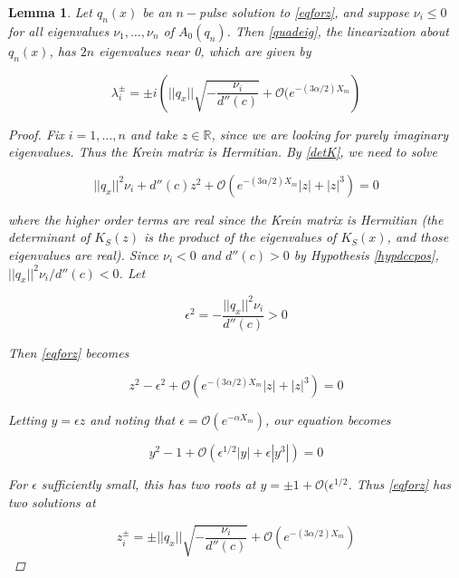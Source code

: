 \documentclass[12pt]{article}
\def\R{{\mathbb R}}
\newtheorem{lemma}{Lemma}
\begin{document}
\begin{lemma}
Let $q_n(x)$ be an $n-$pulse solution to \eqref{eqforz}, and suppose $\nu_i \leq 0$ for all eigenvalues $\nu_1, \dots, \nu_n$ of $A_0(q_n)$. Then \eqref{quadeig}, the linearization about $q_n(x)$, has $2n$ eigenvalues near 0, which are given by

\begin{equation}
\lambda_i^\pm = \pm i \left( ||q_x|| \sqrt{ -\frac{ \nu_i}{d''(c)} } + \mathcal{O}(e^{-(3 \alpha/2) X_m} \right)
\end{equation}

\begin{proof}
Fix $i = 1, \dots, n$ and take $z \in \R$, since we are looking for purely imaginary eigenvalues. Thus the Krein matrix is Hermitian. By \eqref{detK}, we need to solve

\begin{equation}\label{eqforz}
||q_x||^2 \nu_i + d''(c) z^2 + \mathcal{O}(e^{-(3 \alpha/2) X_m}|z| + |z|^3) = 0
\end{equation}

where the higher order terms are real since the Krein matrix is Hermitian (the determinant of $K_S(z)$ is the product of the eigenvalues of $K_S(x)$, and those eigenvalues are real). Since $\nu_i < 0$ and $d''(c) > 0$ by Hypothesis \ref{hypdccpos}, $||q_x||^2 \nu_i / d''(c) < 0$. Let

\begin{equation}
\epsilon^2 = -\frac{||q_x||^2 \nu_i}{d''(c)} > 0
\end{equation}

Then \eqref{eqforz} becomes

\begin{equation}
z^2 - \epsilon^2 + \mathcal{O}(e^{-(3 \alpha/2) X_m}|z| + |z|^3) = 0
\end{equation}

Letting $y = \epsilon z$ and noting that $\epsilon = \mathcal{O}(e^{-\alpha X_m})$, our equation becomes

\begin{equation}
y^2 - 1 + \mathcal{O}(\epsilon^{1/2 }|y| + \epsilon|y^3|) = 0
\end{equation}

For $\epsilon$ sufficiently small, this has two roots at $y = \pm 1 + \mathcal{O}(\epsilon^{1/2}$. Thus \eqref{eqforz} has two solutions at

\begin{equation}
z_i^\pm = \pm ||q_x|| \sqrt{ -\frac{ \nu_i}{d''(c)} } + \mathcal{O}(e^{-(3 \alpha/2) X_m})
\end{equation}


\end{proof}
\end{lemma}
\end{document}
